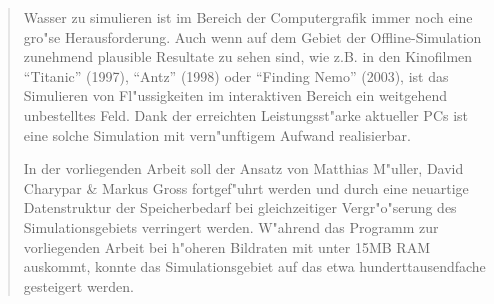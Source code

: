 \begin{abstract}
Wasser zu simulieren ist im Bereich der Computergrafik immer noch eine gro"se Herausforderung.
Auch wenn auf dem Gebiet der Offline-Simulation zunehmend plausible Resultate zu sehen sind, wie z.B. in den Kinofilmen "`Titanic"' (1997), "`Antz"' (1998) oder "`Finding Nemo"' (2003), ist das Simulieren von Fl"ussigkeiten im interaktiven Bereich ein weitgehend unbestelltes Feld.
Dank der erreichten Leistungsst"arke aktueller PCs ist eine solche Simulation mit vern"unftigem Aufwand realisierbar.

In der vorliegenden Arbeit soll der Ansatz von Matthias M"uller, David Charypar \& Markus Gross \cite{ETHZ} fortgef"uhrt werden und durch eine neuartige Datenstruktur der Speicherbedarf bei gleichzeitiger Vergr"o"serung des Simulationsgebiets verringert werden.
W"ahrend das Programm zur vorliegenden Arbeit bei h"oheren Bildraten mit unter 15MB RAM auskommt, konnte das Simulationsgebiet auf das etwa hunderttausendfache gesteigert werden.
\end{abstract}